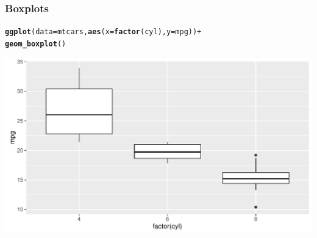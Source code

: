 \documentclass[12pt]{beamer}\usepackage[]{graphicx}\usepackage[]{color}
\makeatletter
\newcommand{\hlopt}[1]{\textcolor[rgb]{0,0,0}{#1}}%
\newcommand{\hlstd}[1]{\textcolor[rgb]{0.345,0.345,0.345}{#1}}%
\newcommand{\hlkwc}[1]{\textcolor[rgb]{0.333,0.667,0.333}{#1}}%
\newcommand{\hlkwd}[1]{\textcolor[rgb]{0.737,0.353,0.396}{\textbf{#1}}}%
\newenvironment{kframe}{%
 \def\at@end@of@kframe{}%
 \ifinner\ifhmode%
  \def\at@end@of@kframe{\end{minipage}}%
  \begin{minipage}{\columnwidth}%
 \fi\fi%
 \def\FrameCommand##1{\hskip\@totalleftmargin \hskip-\fboxsep
 \colorbox{shadecolor}{##1}\hskip-\fboxsep
     \hskip-\linewidth \hskip-\@totalleftmargin \hskip\columnwidth}%
 \MakeFramed {\advance\hsize-\width
   \@totalleftmargin\z@ \linewidth\hsize
   \@setminipage}}%
 {\par\unskip\endMakeFramed%
 \at@end@of@kframe}
\newenvironment{knitrout}{}{} %
\makeatother
\begin{document}
\begin{frame}[fragile]
\frametitle{Boxplots}

\begin{knitrout}\scriptsize
{}\color{fgcolor}\begin{kframe}
\begin{alltt}
\hlkwd{ggplot}\hlstd{(}\hlkwc{data} \hlstd{= mtcars,} \hlkwd{aes}\hlstd{(}\hlkwc{x} \hlstd{=} \hlkwd{factor}\hlstd{(cyl),} \hlkwc{y} \hlstd{= mpg))} \hlopt{+}
  \hlkwd{geom_boxplot}\hlstd{()}
\end{alltt}
\end{kframe}

{\centering \includegraphics[width=.9\linewidth,height=.5\linewidth]{figure/unnamed-chunk-19-1} 

}



\end{knitrout}

\end{frame}

\end{document}
